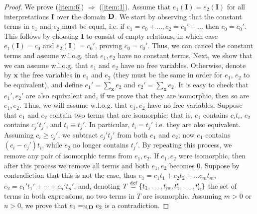 \begin{proof} We prove (\ref{item:6}) $\Rightarrow$ (\ref{item:1}).
  Assume that $e_1(\pmb{I})=e_2(\pmb{I})$ for all interpretations $\pmb{I}$ over the domain $\mathbf D$.  We start by observing that the constant terms in $e_1$ and $e_2$ must be equal, i.e. if $e_1 = c_0 + \ldots, e_2 = c_0' + \ldots$ then $c_0 = c_0'$.  This follows by choosing $\pmb{I}$ to consist of empty relations, in which case $e_1(\pmb{I})=c_0$ and $e_2(\pmb{I})=c_0'$, proving $c_0=c_0'$.  Thus, we can cancel the constant terms and assume w.l.o.g. that $e_1,e_2$ have no constant terms.
Next, we show that we can  assume w.l.o.g. that  $e_1$ and $e_2$ have no free variables.  Otherwise, denote by $\pmb{x}$ the free variables in $e_1$ and $e_2$ (they must be the same in order for $e_1$, $e_2$ to be equivalent), and define $e_1' = \sum_{\pmb{x}} e_2$ and $e_2' = \sum_{\pmb{x}} e_2$.  It is easy to check that $e_1', e_2'$ are also equivalent and, if we prove that they are isomorphic, then so are $e_1, e_2$.  Thus, we will assume w.l.o.g. that $e_1, e_2$ have no free variables.
%
% 
% 
% 
Suppose that $e_1$ and $e_2$ contain two terms that are isomorphic: that is, $e_1$ contains $c_it_i$, $e_2$ contains $c_j't_j'$, and $t_i \equiv t_j'$.  In particular, $t_i=t_j'$ i.e. they are also equivalent.  Assuming $c_i \geq c_j'$, we subtract $c_j't_j'$ from both $e_1$ and $e_2$; now $e_1$ contains $(c_i - c_j')t_i$, while $e_2$ no longer contains $t_j'$.  By repeating this process, we remove any pair of isomorphic terms from $e_1, e_2$.  If $e_1, e_2$ were isomorphic, then after this process we remove all terms and both $e_1, e_2$ becomes 0.  Suppose by contradiction that this is not the case, thus $e_1 = c_1 t_1 + c_2 t_2 + \ldots c_m t_m$, $e_2 = c_1' t_1' + \cdots + c_n' t_n'$, and, denoting $T \stackrel{\text{def}}{=} \{t_1, \ldots, t_m, t_1', \ldots, t_n'\}$ the set of terms in both expressions, no two terms in $T$ are isomorphic.  Assuming $m >0$ or $n > 0$, we prove that $e_1 =_{\mathbb N,\mathbf D} e_2$ is a contradiction.



\end{proof}
